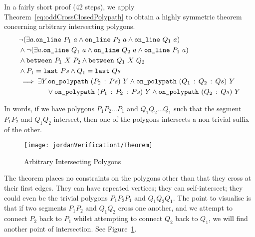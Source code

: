 In a fairly short proof (42 steps), we apply Theorem~\ref{eq:oddCrossClosedPolypath} to obtain a highly symmetric theorem concerning arbitrary intersecting polygons.
\begin{equation}\label{eq:intersectPolypathClosed}
  \begin{aligned}
    &\neg(\exists a.\texttt{on\_line}\ P_1\ a\wedge \texttt{on\_line}\ P_2\ a\wedge \texttt{on\_line}\ Q_1\ a)\\
    &\wedge\neg(\exists a.\texttt{on\_line}\ Q_1\ a\wedge \texttt{on\_line}\ Q_2\ a\wedge \texttt{on\_line}\ P_1\ a)\\
    &\wedge\texttt{between}\ P_1\ X\ P_2 \wedge \texttt{between}\ Q_1\ X\ Q_2\\
    &\wedge P_1 = \texttt{last}\ Ps \wedge Q_1 = \texttt{last}\ Qs\\
    &\implies \exists Y. \texttt{on\_polypath}\ (P_2\,:\,Ps)\ Y \wedge \texttt{on\_polypath}\ (Q_1\,:\,Q_2\,:\,Qs)\ Y\\
    &\qquad\qquad\vee \texttt{on\_polypath}\ (P_1\,:\,P_2\,:\,Ps)\ Y \wedge \texttt{on\_polypath}\ (Q_2\,:\,Qs)\ Y\\
  \end{aligned}
\end{equation}

In words, if we have polygons $P_1P_2\ldots P_1$ and $Q_1Q_2\ldots Q_1$ such that the segment $P_1P_2$ and $Q_1Q_2$ intersect, then one of the polygons intersects a non-trivial suffix of the other.

\begin{figure}
\centering\texttt{[image: jordanVerification1/Theorem]}
\caption{Arbitrary Intersecting Polygons}
\label{fig:IntersectingPolygons}
\end{figure}

The theorem places no constraints on the polygons other than that they cross at their first edges. They can have repeated vertices; they can self-intersect; they could even be the trivial polygons $P_1P_2P_1$ and $Q_1Q_2Q_1$. The point to visualise is that if two segments $P_1P_2$ and $Q_1Q_2$ cross one another, and we attempt to connect $P_2$ back to $P_1$ whilst attempting to connect $Q_2$ back to $Q_1$, we will find another point of intersection. See Figure~\ref{fig:IntersectingPolygons}.

